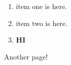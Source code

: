\documentclass[asn=1]{lingsyn}
\author{Jacob Chaffin}
\begin{document}
\makeatletter
\maketitle

\begin{enumerate}
\item item one is here.
\item item two is here.
\item \textbf{HI}
\end{enumerate}
\newpage

Another page!
\end{document}
